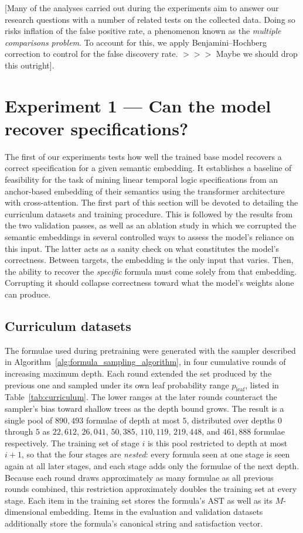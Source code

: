 \documentclass[titlepage,a4paper,11pt]{report}
\begin{document}
    [Many of the analyses carried out during the experiments aim to answer our research questions with a number of related tests on the collected data. Doing so risks inflation of the false positive rate, a phenomenon known as the \emph{multiple comparisons problem}. To account for this, we apply Benjamini--Hochberg correction to control for the false discovery rate. $>>>$ Maybe we should drop this outright].
    
    
    \section{Experiment 1 --- Can the model recover specifications?} \label{sec:exp1_feasibility}
    The first of our experiments tests how well the trained base model recovers a correct specification for a given semantic embedding. It establishes a baseline of feasibility for the task of mining linear temporal logic specifications from an anchor-based embedding of their semantics using the transformer architecture with cross-attention. The first part of this section will be devoted to detailing the curriculum datasets and training procedure. This is followed by the results from the two validation passes, as well as an ablation study in which we corrupted the semantic embeddings in several controlled ways to assess the model's reliance on this input. The latter acts as a sanity check on what constitutes the model's correctness. Between targets, the embedding is the only input that varies. Then, the ability to recover the \emph{specific} formula must come solely from that embedding. Corrupting it should collapse correctness toward what the model's weights alone can produce.

    
    \subsection{Curriculum datasets}\label{sec:curriculum_data}
    The formulae used during pretraining were generated with the sampler described in Algorithm~\ref{alg:formula_sampling_algorithm}, in four cumulative rounds of increasing maximum depth. Each round extended the set produced by the previous one and sampled under its own leaf probability range $p_{\text{leaf}}$, listed in Table~\ref{tab:curriculum}. The lower ranges at the later rounds counteract the sampler's bias toward shallow trees as the depth bound grows. The result is a single pool of $890{,}493$ formulae of depth at most $5$, distributed over depths $0$ through $5$ as $22{,}612$, $26{,}041$, $50{,}385$, $110{,}119$, $219{,}448$, and $461{,}888$ formulae respectively. The training set of stage $i$ is this pool restricted to depth at most $i+1$, so that the four stages are \emph{nested}: every formula seen at one stage is seen again at all later stages, and each stage adds only the formulae of the next depth. Because each round draws approximately as many formulae as all previous rounds combined, this restriction approximately doubles the training set at every stage. Each item in the training set stores the formula's AST as well as its $M$-dimensional embedding. Items in the evaluation and validation datasets additionally store the formula's canonical string and satisfaction vector.
    
\end{document}
